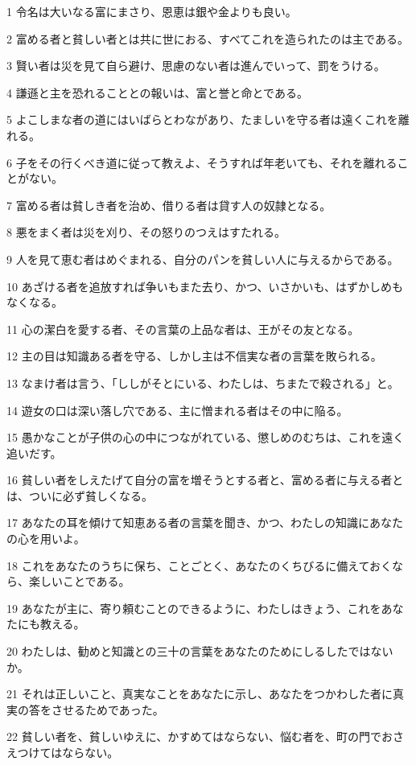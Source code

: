 \par 1 令名は大いなる富にまさり、恩恵は銀や金よりも良い。
\par 2 富める者と貧しい者とは共に世におる、すべてこれを造られたのは主である。
\par 3 賢い者は災を見て自ら避け、思慮のない者は進んでいって、罰をうける。
\par 4 謙遜と主を恐れることとの報いは、富と誉と命とである。
\par 5 よこしまな者の道にはいばらとわながあり、たましいを守る者は遠くこれを離れる。
\par 6 子をその行くべき道に従って教えよ、そうすれば年老いても、それを離れることがない。
\par 7 富める者は貧しき者を治め、借りる者は貸す人の奴隷となる。
\par 8 悪をまく者は災を刈り、その怒りのつえはすたれる。
\par 9 人を見て恵む者はめぐまれる、自分のパンを貧しい人に与えるからである。
\par 10 あざける者を追放すれば争いもまた去り、かつ、いさかいも、はずかしめもなくなる。
\par 11 心の潔白を愛する者、その言葉の上品な者は、王がその友となる。
\par 12 主の目は知識ある者を守る、しかし主は不信実な者の言葉を敗られる。
\par 13 なまけ者は言う、「ししがそとにいる、わたしは、ちまたで殺される」と。
\par 14 遊女の口は深い落し穴である、主に憎まれる者はその中に陥る。
\par 15 愚かなことが子供の心の中につながれている、懲しめのむちは、これを遠く追いだす。
\par 16 貧しい者をしえたげて自分の富を増そうとする者と、富める者に与える者とは、ついに必ず貧しくなる。
\par 17 あなたの耳を傾けて知恵ある者の言葉を聞き、かつ、わたしの知識にあなたの心を用いよ。
\par 18 これをあなたのうちに保ち、ことごとく、あなたのくちびるに備えておくなら、楽しいことである。
\par 19 あなたが主に、寄り頼むことのできるように、わたしはきょう、これをあなたにも教える。
\par 20 わたしは、勧めと知識との三十の言葉をあなたのためにしるしたではないか。
\par 21 それは正しいこと、真実なことをあなたに示し、あなたをつかわした者に真実の答をさせるためであった。
\par 22 貧しい者を、貧しいゆえに、かすめてはならない、悩む者を、町の門でおさえつけてはならない。
